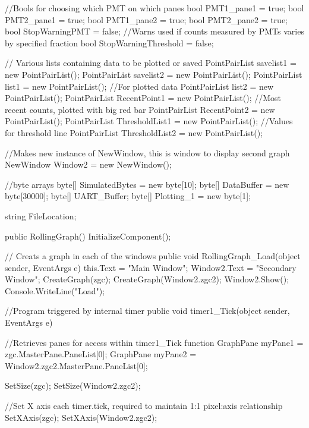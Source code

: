 {{        //Bools for choosing which PMT on which panes
        bool PMT1_pane1 = true;
        bool PMT2_pane1 = true;
        bool PMT1_pane2 = true;
        bool PMT2_pane2 = true;
        bool StopWarningPMT = false; //Warns used if counts measured by PMTs varies by specified fraction
        bool StopWarningThreshold = false;

        // Various lists containing data to be plotted or saved
        PointPairList savelist1 = new PointPairList();
        PointPairList savelist2 = new PointPairList();
        PointPairList list1 = new PointPairList();  //For plotted data
        PointPairList list2 = new PointPairList();
        PointPairList RecentPoint1 = new PointPairList(); //Most recent counts, plotted with big red bar
        PointPairList RecentPoint2 = new PointPairList();
        PointPairList ThresholdList1 = new PointPairList(); //Values for threshold line
        PointPairList ThresholdList2 = new PointPairList();

        //Makes new instance of NewWindow, this is window to display second graph
        NewWindow Window2 = new NewWindow();
        
        //byte arrays
        byte[] SimulatedBytes = new byte[10];
        byte[] DataBuffer = new byte[30000];
        byte[] UART_Buffer;
        byte[] Plotting_1 = new byte[1];

        string FileLocation;

        public RollingGraph()
        {
            InitializeComponent();
        }

        // Creats a graph in each of the windows
        public void RollingGraph_Load(object sender, EventArgs e)
        {
            this.Text = "Main Window";
            Window2.Text = "Secondary Window";
            CreateGraph(zgc);
            CreateGraph(Window2.zgc2);
            Window2.Show();
            Console.WriteLine("Load");
        }

        //Program triggered by internal timer
        public void timer1_Tick(object sender, EventArgs e)
        {
            //Retrieves panes for access within timer1_Tick function
            GraphPane myPane1 = zgc.MasterPane.PaneList[0];
            GraphPane myPane2 = Window2.zgc2.MasterPane.PaneList[0];

            SetSize(zgc);
            SetSize(Window2.zgc2);

            //Set X axis each timer.tick, required to maintain 1:1 pixel:axis relationship
            SetXAxis(zgc);
            SetXAxis(Window2.zgc2);

}}}
